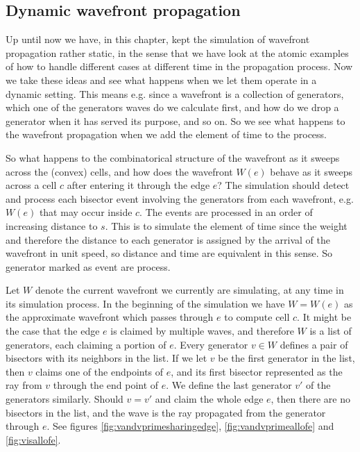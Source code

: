 \subsection{Dynamic wavefront propagation} \label{section:dynamicwavefront}

Up until now we have, in this chapter, kept the simulation of wavefront propagation rather static, in the sense that
we have look at the atomic examples of how to handle different cases at different time in the propagation process.
Now we take these ideas and see what happens when we let them operate in a dynamic setting. This means e.g. 
since a wavefront is a collection of generators, which one of the generators waves do we calculate first, and how do
we drop a generator when it has served its purpose, and so on. So we see what happens to the wavefront propagation 
when we add the element of time to the process.

So what happens to the combinatorical structure of the wavefront as it sweeps across the (convex) cells, and how 
does the wavefront $W(e)$ behave as it sweeps across a cell $c$ after entering it through the edge $e$? The 
simulation should detect and process each bisector event involving the generators from each wavefront, e.g. 
$W(e)$ that may occur inside $c$. The events are processed in an order of increasing distance to $s$. This is to 
simulate the element of time since the weight and therefore the distance to each generator is assigned by the 
arrival of the wavefront in unit speed, so distance and time are equivalent in this sense. So generator marked as 
event are process.

Let $W$ denote the current wavefront we currently are simulating, at any time in its simulation process. In the 
beginning of the simulation we have $W = W(e)$ as the approximate wavefront which passes through $e$ to compute cell
$c$. It might be the case that the edge $e$ is claimed by multiple waves, and therefore $W$ is a list of generators,
each claiming a portion of $e$. Every generator $v \in W$ defines a pair of bisectors with its neighbors in the 
list. If we let $v$ be the first generator in the list, then $v$ claims one of the endpoints of $e$, and its first 
bisector represented as the ray from $v$ through the end point of $e$. We define the last generator $v'$ 
of the generators similarly. Should $v = v'$ and claim the whole edge $e$, then there are no bisectors in the list, and the 
wave is the ray propagated from the generator through $e$. See figures \ref{fig:vandvprimesharingedge}, \ref{fig:vandvprimeallofe} and \ref{fig:visallofe}.

